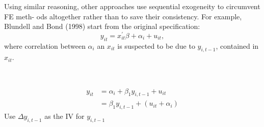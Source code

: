 Using similar reasoning, other approaches use sequential exogeneity to circumvent FE meth-
ods altogether rather than to save their consistency. For example, Blundell and Bond (1998)
start from the original specification:
\[y_{it} = x_{it}^{\prime} \beta + \alpha_i + u_{it}, \]
where correlation between $\alpha_{i}$ an $x_{it}$ is suspected to be due to $y_{i,t-1}$, contained in $x_{it}.$

\begin{definition}
    \

    \begin{align*}
        y_{it} &= \alpha _i + \beta_1 y_{i,t-1} + u_{it} \\
        &= \beta_1 y_{i,t-1} + (u_{it} + \alpha_i) 
    \end{align*}
    Use $\Delta y_{i,t-1}$ as the IV for $y_{i,t-1}$
\end{definition}
